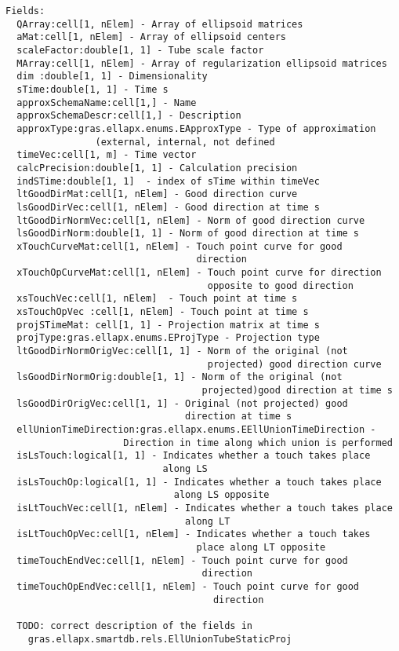 \begin{verbatim}
Fields:
  QArray:cell[1, nElem] - Array of ellipsoid matrices
  aMat:cell[1, nElem] - Array of ellipsoid centers
  scaleFactor:double[1, 1] - Tube scale factor
  MArray:cell[1, nElem] - Array of regularization ellipsoid matrices
  dim :double[1, 1] - Dimensionality
  sTime:double[1, 1] - Time s
  approxSchemaName:cell[1,] - Name
  approxSchemaDescr:cell[1,] - Description
  approxType:gras.ellapx.enums.EApproxType - Type of approximation
                (external, internal, not defined
  timeVec:cell[1, m] - Time vector
  calcPrecision:double[1, 1] - Calculation precision
  indSTime:double[1, 1]  - index of sTime within timeVec
  ltGoodDirMat:cell[1, nElem] - Good direction curve
  lsGoodDirVec:cell[1, nElem] - Good direction at time s
  ltGoodDirNormVec:cell[1, nElem] - Norm of good direction curve
  lsGoodDirNorm:double[1, 1] - Norm of good direction at time s
  xTouchCurveMat:cell[1, nElem] - Touch point curve for good
                                  direction
  xTouchOpCurveMat:cell[1, nElem] - Touch point curve for direction
                                    opposite to good direction
  xsTouchVec:cell[1, nElem]  - Touch point at time s
  xsTouchOpVec :cell[1, nElem] - Touch point at time s
  projSTimeMat: cell[1, 1] - Projection matrix at time s
  projType:gras.ellapx.enums.EProjType - Projection type
  ltGoodDirNormOrigVec:cell[1, 1] - Norm of the original (not
                                    projected) good direction curve
  lsGoodDirNormOrig:double[1, 1] - Norm of the original (not
                                   projected)good direction at time s
  lsGoodDirOrigVec:cell[1, 1] - Original (not projected) good
                                direction at time s
  ellUnionTimeDirection:gras.ellapx.enums.EEllUnionTimeDirection -
                     Direction in time along which union is performed
  isLsTouch:logical[1, 1] - Indicates whether a touch takes place
                            along LS
  isLsTouchOp:logical[1, 1] - Indicates whether a touch takes place
                              along LS opposite
  isLtTouchVec:cell[1, nElem] - Indicates whether a touch takes place
                                along LT
  isLtTouchOpVec:cell[1, nElem] - Indicates whether a touch takes
                                  place along LT opposite
  timeTouchEndVec:cell[1, nElem] - Touch point curve for good
                                   direction
  timeTouchOpEndVec:cell[1, nElem] - Touch point curve for good
                                     direction

  TODO: correct description of the fields in
    gras.ellapx.smartdb.rels.EllUnionTubeStaticProj
\end{verbatim}


